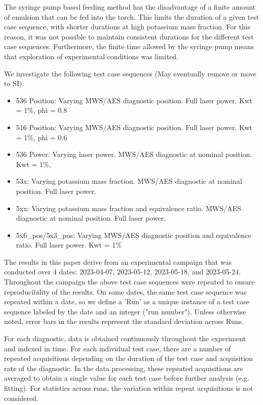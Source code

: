 The syringe pump based feeding method has the disadvantage of a finite amount of emulsion that can be fed into the torch. This limits the duration of a given test case sequence, with shorter durations at high potassium mass fraction. For this reason, it was not possible to maintain consistent durations for the different test case sequences. Furthermore, the finite time allowed by the syringe pump means that exploration of experimental conditions was limited. 

We investigate the following test case sequences (May eventually remove or move to SI):
\begin{itemize}
    \item 536 Position: Varying MWS/AES diagnostic position. Full laser power. Kwt = 1\%, phi = 0.8
    \item 516 Position: Varying MWS/AES diagnostic position. Full laser power. Kwt = 1\%, phi = 0.6
    \item 536 Power: Varying laser power. MWS/AES diagnostic at nominal position. Kwt = 1\%, 
    \item 53x: Varying potassium mass fraction. MWS/AES diagnostic at nominal position. Full laser power.
    \item 5xx: Varying potassium mass fraction and equivalence ratio. MWS/AES diagnostic at nominal position. Full laser power.
    \item 5x6\_pos/5x3\_pos: Varying MWS/AES diagnostic position and equivalence ratio. Full laser power. Kwt = 1\%
\end{itemize}

The results in this paper derive from an experimental campaign that was conducted over 4 dates: 2023-04-07, 2023-05-12, 2023-05-18, and 2023-05-24. Throughout the campaign the above test case sequences were repeated to ensure reproducibility of the results. On some dates, the same test case sequence was repeated within a date, so we define a 'Run' as a unique instance of a test case sequence labeled by the date and an integer ("run number").  Unless otherwise noted, error bars in the results represent the standard deviation across Runs. 

For each diagnostic, data is obtained continuously throughout the experiment and indexed in time. For each individual test case, there are a number of repeated acquisitions depending on the duration of the test case and acquisition rate of the diagnostic. In the data processing, these repeated acquisitions are averaged to obtain a single value for each test case before further analysis (e.g. fitting). For statistics across runs, the variation within repeat acquisitions is not considered. 

